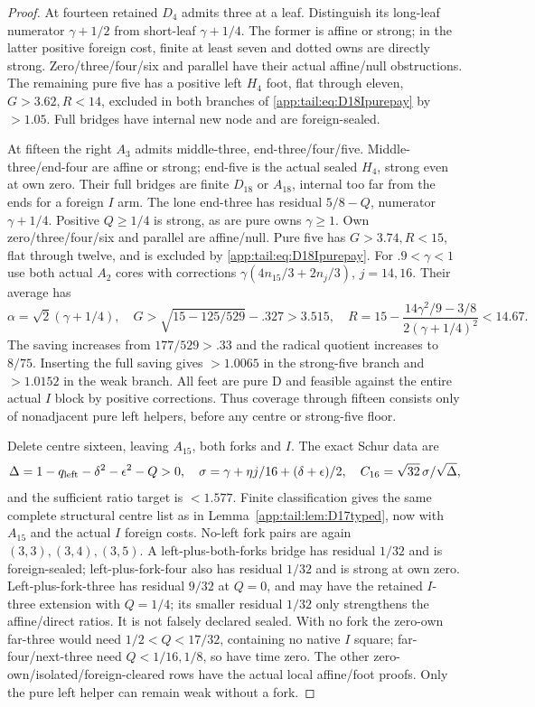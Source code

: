 \documentclass[11pt]{article}
\theoremstyle{definition}
\theoremstyle{remark}
\begin{document}
\begin{proof}
At fourteen retained $D_4$ admits three at a leaf. Distinguish
its long-leaf numerator $\gamma+1/2$ from short-leaf
$\gamma+1/4$. The former is affine or strong; in the latter
positive foreign cost, finite at least seven and dotted owns
are directly strong. Zero/three/four/six and parallel have
their actual affine/null obstructions. The remaining pure
five has a positive left $H_4$ foot, flat through eleven,
$G>3.62,R<14$, excluded in both branches of
\eqref{app:tail:eq:D18Ipurepay} by $>1.05$.
Full bridges have internal new node and are foreign-sealed.

At fifteen the right $A_3$ admits middle-three, end-three/four/five.
Middle-three/end-four are affine or strong; end-five is the
actual sealed $H_4$, strong even at own zero.
Their full bridges are finite $D_{18}$ or $A_{18}$, internal
too far from the ends for a foreign $I$ arm.
The lone end-three has residual $5/8-Q$, numerator
$\gamma+1/4$. Positive $Q\ge1/4$ is strong, as are pure
owns $\gamma\ge1$. Own zero/three/four/six and parallel
are affine/null. Pure five has $G>3.74,R<15$, flat through
twelve, and is excluded by \eqref{app:tail:eq:D18Ipurepay}.
For $.9<\gamma<1$ use both actual $A_2$ cores with corrections
$\gamma(4n_{15}/3+2n_j/3)$, $j=14,16$.
Their average has
\[
 \alpha=\sqrt2(\gamma+1/4),\quad
 G>\sqrt{15-125/529}-.327>3.515,\quad
 R=15-{\frac{14\gamma^2/9-3/8}{2(\gamma+1/4)^2}}<14.67.
\]
The saving increases from $177/529>.33$ and the radical
quotient increases to $8/75$. Inserting the full saving gives
$>1.0065$ in the strong-five branch and $>1.0152$ in the
weak branch. All feet are pure D and feasible against the
entire actual $I$ block by positive corrections.
Thus coverage through fifteen consists only of nonadjacent
pure left helpers, before any centre or strong-five floor.

Delete centre sixteen, leaving $A_{15}$, both forks and $I$.
The exact Schur data are
\[
 \Delta=1-q_{\rm left}-\delta^2-\epsilon^2-Q>0,
 \quad\sigma=\gamma+\eta j/16+(\delta+\epsilon)/2,
 \quad C_{16}=\sqrt{32}\,\sigma/\sqrt\Delta,
\]
and the sufficient ratio target is $<1.577$.
Finite classification gives the same complete structural centre
list as in Lemma~\ref{app:tail:lem:D17typed}, now with
$A_{15}$ and the actual $I$ foreign costs.
No-left fork pairs are again $(3,3),(3,4),(3,5)$.
A left-plus-both-forks bridge has residual $1/32$ and is
foreign-sealed; left-plus-fork-four also has residual $1/32$
and is strong at own zero. Left-plus-fork-three has residual
$9/32$ at $Q=0$, and may have the retained $I$-three extension
with $Q=1/4$; its smaller residual $1/32$ only strengthens
the affine/direct ratios. It is not falsely declared sealed.
With no fork the zero-own far-three would need
$1/2<Q<17/32$, containing no native $I$ square;
far-four/next-three need $Q<1/16,1/8$, so have time zero.
The other zero-own/isolated/foreign-cleared rows have the
actual local affine/foot proofs. Only the pure left helper
can remain weak without a fork.


\end{proof}
\end{document}
